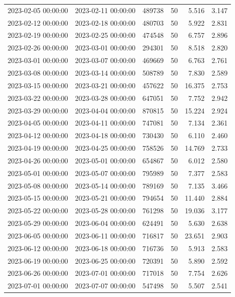 \begin{tabular}{llrrrr}
2023-02-05 00:00:00 & 2023-02-11 00:00:00 & 489738 & 50 & 5.516 & 3.147 \\
2023-02-12 00:00:00 & 2023-02-18 00:00:00 & 480703 & 50 & 5.922 & 2.831 \\
2023-02-19 00:00:00 & 2023-02-25 00:00:00 & 474548 & 50 & 6.757 & 2.896 \\
2023-02-26 00:00:00 & 2023-03-01 00:00:00 & 294301 & 50 & 8.518 & 2.820 \\
2023-03-01 00:00:00 & 2023-03-07 00:00:00 & 469669 & 50 & 6.763 & 2.761 \\
2023-03-08 00:00:00 & 2023-03-14 00:00:00 & 508789 & 50 & 7.830 & 2.589 \\
2023-03-15 00:00:00 & 2023-03-21 00:00:00 & 457622 & 50 & 16.375 & 2.753 \\
2023-03-22 00:00:00 & 2023-03-28 00:00:00 & 647051 & 50 & 7.752 & 2.942 \\
2023-03-29 00:00:00 & 2023-04-04 00:00:00 & 870815 & 50 & 15.224 & 2.924 \\
2023-04-05 00:00:00 & 2023-04-11 00:00:00 & 747081 & 50 & 7.134 & 2.361 \\
2023-04-12 00:00:00 & 2023-04-18 00:00:00 & 730430 & 50 & 6.110 & 2.460 \\
2023-04-19 00:00:00 & 2023-04-25 00:00:00 & 758526 & 50 & 14.769 & 2.733 \\
2023-04-26 00:00:00 & 2023-05-01 00:00:00 & 654867 & 50 & 6.012 & 2.580 \\
2023-05-01 00:00:00 & 2023-05-07 00:00:00 & 795989 & 50 & 7.377 & 2.583 \\
2023-05-08 00:00:00 & 2023-05-14 00:00:00 & 789169 & 50 & 7.135 & 3.466 \\
2023-05-15 00:00:00 & 2023-05-21 00:00:00 & 794654 & 50 & 11.440 & 2.884 \\
2023-05-22 00:00:00 & 2023-05-28 00:00:00 & 761298 & 50 & 19.036 & 3.177 \\
2023-05-29 00:00:00 & 2023-06-04 00:00:00 & 624491 & 50 & 5.630 & 2.638 \\
2023-06-05 00:00:00 & 2023-06-11 00:00:00 & 716817 & 50 & 23.651 & 2.903 \\
2023-06-12 00:00:00 & 2023-06-18 00:00:00 & 716736 & 50 & 5.913 & 2.583 \\
2023-06-19 00:00:00 & 2023-06-25 00:00:00 & 720391 & 50 & 5.890 & 2.592 \\
2023-06-26 00:00:00 & 2023-07-01 00:00:00 & 717018 & 50 & 7.754 & 2.626 \\
2023-07-01 00:00:00 & 2023-07-07 00:00:00 & 547498 & 50 & 5.507 & 2.541 \\

\end{tabular}
